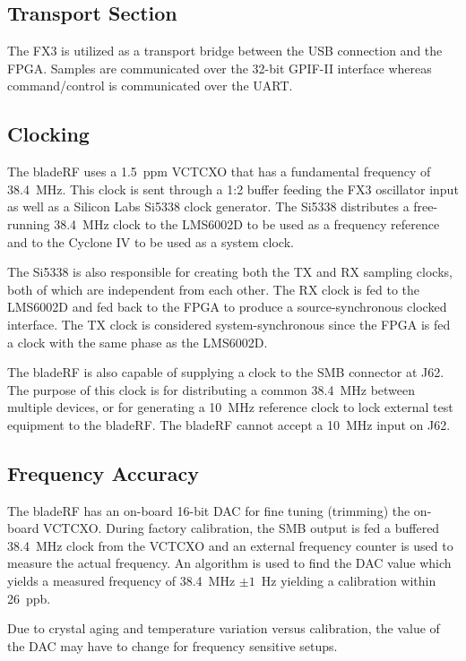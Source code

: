 \subsection{Transport Section} \label{sec:arch-transport}
The FX3 is utilized as a transport bridge between the USB connection and the
FPGA.  Samples are communicated over the 32-bit GPIF-II interface whereas
command/control is communicated over the UART.

\subsection{Clocking} \label{sec:arch-clocking}
The bladeRF uses a 1.5~ppm VCTCXO that has a fundamental frequency of 38.4~MHz.
This clock is sent through a 1:2 buffer feeding the FX3 oscillator input as
well as a Silicon Labs Si5338 clock generator.  The Si5338 distributes a
free-running 38.4~MHz clock to the LMS6002D to be used as a frequency reference
and to the Cyclone IV to be used as a system clock.

The Si5338 is also responsible for creating both the TX and RX sampling clocks,
both of which are independent from each other.  The RX clock is fed to the
LMS6002D and fed back to the FPGA to produce a source-synchronous clocked
interface.  The TX clock is considered system-synchronous since the
FPGA is fed a clock with the same phase as the LMS6002D.

The bladeRF is also capable of supplying a clock to the SMB connector at J62.
The purpose of this clock is for distributing a common 38.4~MHz between
multiple devices, or for generating a 10~MHz reference clock to lock external
test equipment to the bladeRF.  The bladeRF cannot accept a 10~MHz input on
J62.

\subsection{Frequency Accuracy} \label{sec:arch-accuracy}
The bladeRF has an on-board 16-bit DAC for fine tuning (trimming) the on-board
VCTCXO.  During factory calibration, the SMB output is fed a buffered 38.4~MHz
clock from the VCTCXO and an external frequency counter is used to measure the
actual frequency.  An algorithm is used to find the DAC value which yields a
measured frequency of 38.4~MHz $\pm 1$~Hz yielding a calibration within 26~ppb.

Due to crystal aging and temperature variation versus calibration, the value
of the DAC may have to change for frequency sensitive setups.

